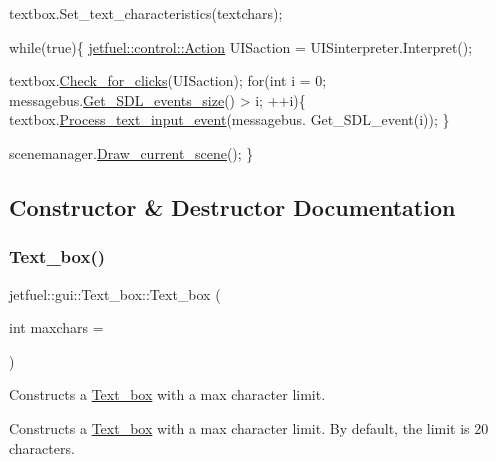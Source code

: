 \begin{DoxyCode}
textbox.Set\_text\_characteristics(textchars);

\textcolor{keywordflow}{while}(\textcolor{keyword}{true})\{
    \hyperlink{structjetfuel_1_1control_1_1Action}{jetfuel::control::Action} UISaction =
    UISinterpreter.Interpret();

    textbox.\hyperlink{classjetfuel_1_1gui_1_1Text__box_a088d62b01be4747ea2e7a6218516e036}{Check\_for\_clicks}(UISaction);
    \textcolor{keywordflow}{for}(\textcolor{keywordtype}{int} i = 0; messagebus.\hyperlink{classjetfuel_1_1core_1_1Message__bus_aa363b50d4ba99ae86430b5f12610fd39}{Get\_SDL\_events\_size}() > i; ++i)\{
        textbox.\hyperlink{classjetfuel_1_1gui_1_1Text__box_a4671dbf122880e20bdc8953c4ea8a045}{Process\_text\_input\_event}(messagebus.
                                        Get\_SDL\_event(i));
    \}

    scenemanager.\hyperlink{classjetfuel_1_1draw_1_1Scene__manager_a8af9a3abfd5121b1b8556342de435773}{Draw\_current\_scene}();
\}
\end{DoxyCode}
 

\subsection{Constructor \& Destructor Documentation}
\mbox{\label{classjetfuel_1_1gui_1_1Text__box_ac369a374d4f6d83029bc2536ada96b1b}} 
\subsubsection{\texorpdfstring{Text\+\_\+box()}{Text\_box()}}
{\footnotesize\ttfamily jetfuel\+::gui\+::\+Text\+\_\+box\+::\+Text\+\_\+box (\begin{DoxyParamCaption}\item[{int}]{maxchars = {} }\end{DoxyParamCaption})}



Constructs a \hyperlink{classjetfuel_1_1gui_1_1Text__box}{Text\+\_\+box} with a max character limit. 

Constructs a \hyperlink{classjetfuel_1_1gui_1_1Text__box}{Text\+\_\+box} with a max character limit. By default, the limit is 20 characters.



